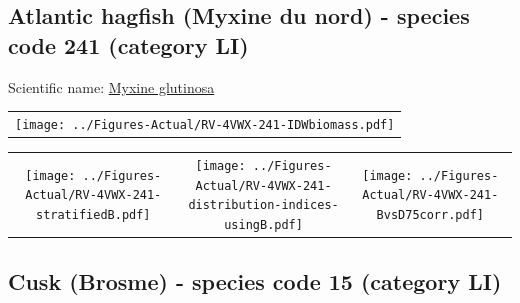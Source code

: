 \documentclass[12pt]{article}\usepackage[]{graphicx}\usepackage[]{color}
\begin{document}
\renewcommand\thefigure{\thesubsection\Alph{figure}}

\setcounter{figure}{0}

\hypertarget{sec:241}{%
\subsection{Atlantic hagfish (Myxine du nord) - species code 241 (category LI)}\label{sec:241}}

  


Scientific name: \href{http://www.marinespecies.org/aphia.php?p=taxdetails\&id=101170}{Myxine glutinosa} \newline
\begin{minipage}{1.0\textwidth}
 \begin{tabular}{c}
\texttt{[image: ../Figures-Actual/RV-4VWX-241-IDWbiomass.pdf]} \\ 
\end{tabular} 
\end{minipage}
\newline

\vspace{1cm}
\begin{minipage}{1.0\textwidth}
 \begin{tabular}{ccc}
\texttt{[image: ../Figures-Actual/RV-4VWX-241-stratifiedB.pdf]} & 
\texttt{[image: ../Figures-Actual/RV-4VWX-241-distribution-indices-usingB.pdf]} & 
\texttt{[image: ../Figures-Actual/RV-4VWX-241-BvsD75corr.pdf]} \\ 
\end{tabular} 
\end{minipage}
\clearpage

\renewcommand\thefigure{\thesubsection\Alph{figure}}

\setcounter{figure}{0}

\hypertarget{sec:15}{%
\subsection{Cusk (Brosme) - species code 15 (category LI)}\label{sec:15}}

  
\end{document}
